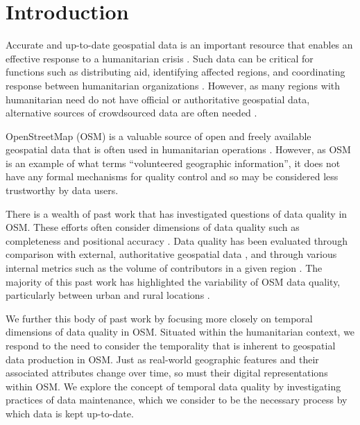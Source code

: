 \chapter{Introduction}
\label{chapterlabel1}

Accurate and up-to-date geospatial data is an important resource that enables an effective response to a humanitarian crisis \parencite{cowan_geospatial_2011, poser_volunteered_2010, soden_infrastructure_2016, zook_volunteered_2010}. Such data can be critical for functions such as distributing aid, identifying affected regions, and coordinating response between humanitarian organizations \parencite{soden_infrastructure_2016}. However, as many regions with humanitarian need do not have official or authoritative geospatial data, alternative sources of crowdsourced data are often needed \parencite{zook_volunteered_2010}. 

OpenStreetMap (OSM) is a valuable source of open and freely available geospatial data that is often used in humanitarian operations \parencite{palen_success_2015, soden_infrastructure_2016}. However, as OSM is an example of what \textcite{goodchild_citizens_2007} terms “volunteered geographic information”, it does not have any formal mechanisms for quality control and so may be considered less trustworthy by data users. 

There is a wealth of past work that has investigated questions of data quality in OSM. These efforts often consider dimensions of data quality such as completeness and positional accuracy \parencite{girres_quality_2010, haklay_how_2010}. Data quality has been evaluated through comparison with external, authoritative geospatial data \parencite{girres_quality_2010, haklay_how_2010, zielstra_comparative_2010}, and through various internal metrics such as the volume of contributors in a given region \parencite{haklay_how_2010-1}. The majority of this past work has highlighted the variability of OSM data quality, particularly between urban and rural locations \parencite{zielstra_comparative_2010}. 

We further this body of past work by focusing more closely on temporal dimensions of data quality in OSM. Situated within the humanitarian context, we respond to the need to consider the temporality that is inherent to geospatial data production in OSM. Just as real-world geographic features and their associated attributes change over time, so must their digital representations within OSM. We explore the concept of temporal data quality by investigating practices of data maintenance, which we consider to be the necessary process by which data is kept up-to-date. 

